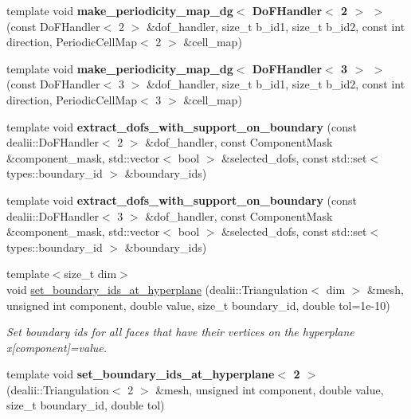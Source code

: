 \begin{DoxyCompactItemize}
\item 
\hypertarget{namespacenatrium_1_1DealIIExtensions_ae31f8793dc208deb99e34201a9c17779}{
template void {\bfseries make\_\-periodicity\_\-map\_\-dg$<$ DoFHandler$<$ 2 $>$ $>$} (const DoFHandler$<$ 2 $>$ \&dof\_\-handler, size\_\-t b\_\-id1, size\_\-t b\_\-id2, const int direction, PeriodicCellMap$<$ 2 $>$ \&cell\_\-map)}
\label{namespacenatrium_1_1DealIIExtensions_ae31f8793dc208deb99e34201a9c17779}

\item 
\hypertarget{namespacenatrium_1_1DealIIExtensions_a4d4a08bca6d3ef3833ba3a0107ea7fa8}{
template void {\bfseries make\_\-periodicity\_\-map\_\-dg$<$ DoFHandler$<$ 3 $>$ $>$} (const DoFHandler$<$ 3 $>$ \&dof\_\-handler, size\_\-t b\_\-id1, size\_\-t b\_\-id2, const int direction, PeriodicCellMap$<$ 3 $>$ \&cell\_\-map)}
\label{namespacenatrium_1_1DealIIExtensions_a4d4a08bca6d3ef3833ba3a0107ea7fa8}

\item 
\hypertarget{namespacenatrium_1_1DealIIExtensions_ae531bdf7ab145d71f306ec1d4a1cefb3}{
template void {\bfseries extract\_\-dofs\_\-with\_\-support\_\-on\_\-boundary} (const dealii::DoFHandler$<$ 2 $>$ \&dof\_\-handler, const ComponentMask \&component\_\-mask, std::vector$<$ bool $>$ \&selected\_\-dofs, const std::set$<$ types::boundary\_\-id $>$ \&boundary\_\-ids)}
\label{namespacenatrium_1_1DealIIExtensions_ae531bdf7ab145d71f306ec1d4a1cefb3}

\item 
\hypertarget{namespacenatrium_1_1DealIIExtensions_a157762b4a7d95c0f6b614f451d1dbd2d}{
template void {\bfseries extract\_\-dofs\_\-with\_\-support\_\-on\_\-boundary} (const dealii::DoFHandler$<$ 3 $>$ \&dof\_\-handler, const ComponentMask \&component\_\-mask, std::vector$<$ bool $>$ \&selected\_\-dofs, const std::set$<$ types::boundary\_\-id $>$ \&boundary\_\-ids)}
\label{namespacenatrium_1_1DealIIExtensions_a157762b4a7d95c0f6b614f451d1dbd2d}

\item 
{\footnotesize template$<$size\_\-t dim$>$ }\\void \hyperlink{namespacenatrium_1_1DealIIExtensions_ae126f478c9cfcae855a24b140b5e64f1}{set\_\-boundary\_\-ids\_\-at\_\-hyperplane} (dealii::Triangulation$<$ dim $>$ \&mesh, unsigned int component, double value, size\_\-t boundary\_\-id, double tol=1e-\/10)
\begin{DoxyCompactList}\small\item\em Set boundary ids for all faces that have their vertices on the hyperplane x\mbox{[}component\mbox{]}=value. \item\end{DoxyCompactList}\item 
\hypertarget{namespacenatrium_1_1DealIIExtensions_a54ad7a3525402e88e1ab01a9c9f6eb6b}{
template void {\bfseries set\_\-boundary\_\-ids\_\-at\_\-hyperplane$<$ 2 $>$} (dealii::Triangulation$<$ 2 $>$ \&mesh, unsigned int component, double value, size\_\-t boundary\_\-id, double tol)}
\label{namespacenatrium_1_1DealIIExtensions_a54ad7a3525402e88e1ab01a9c9f6eb6b}


\end{DoxyCompactItemize}
